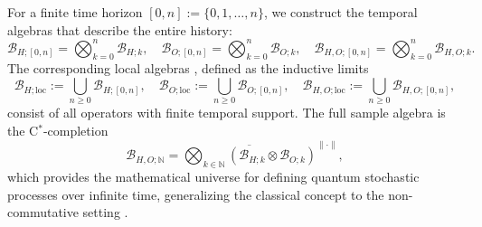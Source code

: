 \documentclass[12pt, reco]{article}
\begin{document}
For a finite time horizon \([0,n] := \{0,1,\dots,n\}\), we construct the temporal algebras that describe the entire history:
\[
\mathcal{B}_{H;[0,n]} = \bigotimes_{k=0}^{n} \mathcal{B}_{H;k}, \quad
\mathcal{B}_{O;[0,n]} = \bigotimes_{k=0}^{n} \mathcal{B}_{O;k}, \quad
\mathcal{B}_{H,O;[0,n]} = \bigotimes_{k=0}^{n} \mathcal{B}_{H,O;k}.
\]
The corresponding  local algebras , defined as the inductive limits
\[
\mathcal{B}_{H;\text{loc}} := \bigcup_{n \ge 0} \mathcal{B}_{H;[0,n]}, \quad
\mathcal{B}_{O;\text{loc}} := \bigcup_{n \ge 0} \mathcal{B}_{O;[0,n]}, \quad
\mathcal{B}_{H,O;\text{loc}} := \bigcup_{n \ge 0} \mathcal{B}_{H,O;[0,n]},
\]
consist of all operators with finite temporal support. The full  sample algebra  is the C\(^*\)-completion
\[
\mathcal{B}_{H,O;\mathbb{N}} = \overline{\bigotimes_{k \in \mathbb{N}} (\mathcal{B}_{H;k} \otimes \mathcal{B}_{O;k})}^{\|\cdot\|},
\]
which provides the mathematical universe for defining quantum stochastic processes over infinite time, generalizing the classical concept to the non-commutative setting \cite{Neumann18, KemenySnell83}.
\end{document}
